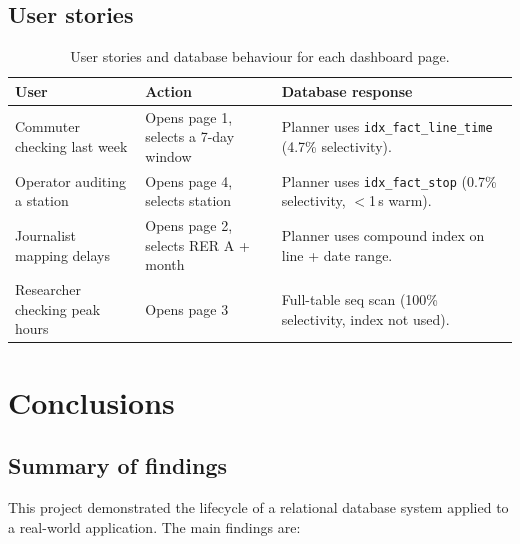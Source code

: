 \documentclass[a4paper,11pt]{article}
\begin{document}
\subsection{User stories}

\begin{table}[H]
\centering
\small
\begin{tabular}{p{3.8cm}p{4cm}p{5cm}}
\toprule
\textbf{User} & \textbf{Action} & \textbf{Database response} \\
\midrule
Commuter checking last week &
  Opens page 1, selects a 7-day window &
  Planner uses \texttt{idx\_fact\_line\_time} (4.7\% selectivity). \\
\addlinespace
Operator auditing a station &
  Opens page 4, selects station &
  Planner uses \texttt{idx\_fact\_stop} (0.7\% selectivity, $<$1\,s warm). \\
\addlinespace
Journalist mapping delays &
  Opens page 2, selects RER A + month &
  Planner uses compound index on line + date range. \\
\addlinespace
Researcher checking peak hours &
  Opens page 3 &
  Full-table seq scan (100\% selectivity, index not used). \\
\bottomrule
\end{tabular}
\caption{User stories and database behaviour for each dashboard page.}
\label{tab:user-stories}
\end{table}

\newpage

\section{Conclusions}
\label{sec:conclusions}

\subsection{Summary of findings}

This project demonstrated the lifecycle of a relational database system applied to a real-world application.
The main findings are:
\end{document}
